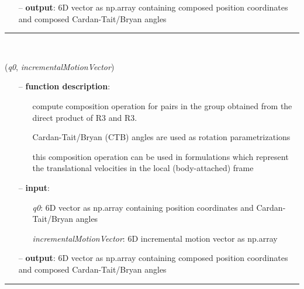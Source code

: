 \begin{itemize}[leftmargin=1.4cm]
\begin{itemize}[leftmargin=0.5cm]
\begin{itemize}[leftmargin=1.4cm]
\begin{itemize}[leftmargin=0.5cm]
\begin{itemize}[leftmargin=1.4cm]
\begin{itemize}[leftmargin=0.5cm]
\begin{itemize}[leftmargin=1.4cm]
\begin{itemize}[leftmargin=1.4cm]
\begin{itemize}[leftmargin=1.4cm]
\begin{itemize}[leftmargin=1.4cm]
\begin{itemize}[leftmargin=0.5cm]
\begin{itemize}[leftmargin=0.7cm]
  \item[--]  {\bf output}: 6D vector as np.array containing composed position coordinates and composed Cardan-Tait/Bryan angles\vspace{12pt}\end{itemize}
%
\noindent\rule{8cm}{0.75pt}\vspace{1pt} \\ 
\begin{flushleft}
\label{sec:lieGroupBasics:CompositionRuleSemiDirectProductR3AndR3RotXYZAngles}
({\it q0}, {\it incrementalMotionVector})
\end{flushleft}
\setlength{\itemindent}{0.7cm}
\begin{itemize}[leftmargin=0.7cm]
  \item[--]  {\bf function description}: \vspace{-6pt}
  \begin{itemize}[leftmargin=1.2cm]
\setlength{\itemindent}{-0.7cm}
    \item[] compute composition operation for pairs in the group obtained from the direct product of R3 and R3.
    \item[]             Cardan-Tait/Bryan (CTB) angles are used as rotation parametrizations
    \item[]             this composition operation can be used in formulations which represent the translational velocities in the local (body-attached) frame
  \end{itemize}
  \item[--]  {\bf input}: \vspace{-6pt}
  \begin{itemize}[leftmargin=1.2cm]
\setlength{\itemindent}{-0.7cm}
    \item[] {\it q0}: 6D vector as np.array containing position coordinates and Cardan-Tait/Bryan angles
    \item[] {\it   incrementalMotionVector}: 6D incremental motion vector as np.array
  \end{itemize}
  \item[--]  {\bf output}: 6D vector as np.array containing composed position coordinates and composed Cardan-Tait/Bryan angles\vspace{12pt}\end{itemize}
%
\noindent\rule{8cm}{0.75pt}\vspace{1pt} \\ 

\end{itemize}
\end{itemize}
\end{itemize}
\end{itemize}
\end{itemize}
\end{itemize}
\end{itemize}
\end{itemize}
\end{itemize}
\end{itemize}
\end{itemize}
